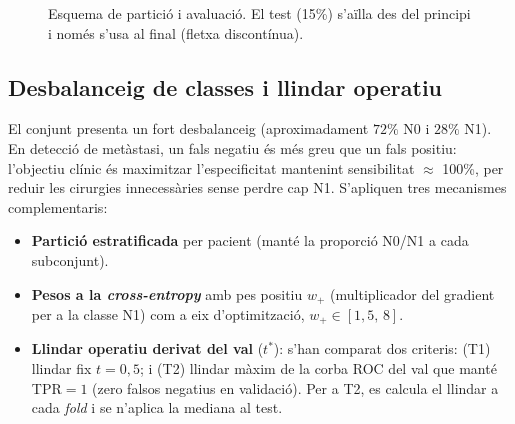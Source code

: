 \documentclass[10pt,a4paper,twocolumn,twoside]{article}
\begin{document}
\begin{figure}[h]
\centering
{}%
\caption{Esquema de partició i avaluació. El test (15\%) s'aïlla des del principi i només s'usa
al final (fletxa discontínua).}
\label{fig:split-scheme}
\end{figure}

\subsection{Desbalanceig de classes i llindar operatiu}

El conjunt presenta un fort desbalanceig (aproximadament $72\%$ N0 i $28\%$ N1). En detecció de metàstasi, un
fals negatiu és més greu que un fals positiu: l'objectiu clínic és maximitzar
l'especificitat mantenint sensibilitat $\approx$ 100\%, per reduir les cirurgies innecessàries
sense perdre cap N1. S'apliquen tres mecanismes complementaris:
\begin{itemize}\itemsep1pt
  \item \textbf{Partició estratificada} per pacient (manté la proporció N0/N1 a cada subconjunt).
  \item \textbf{Pesos a la \textit{cross-entropy}} amb pes positiu $w_+$ (multiplicador del
        gradient per a la classe N1) com a eix d'optimització, $w_+ \in [1{,}5,\,8]$.
  \item \textbf{Llindar operatiu derivat del val} ($t^*$): s'han comparat dos criteris:
        (T1) llindar fix $t\!=\!0{,}5$; i (T2) llindar màxim de la corba ROC del val que
        manté TPR$\!=\!1$ (zero falsos negatius en validació). Per a T2, es calcula el
        llindar a cada \textit{fold} i se n'aplica la mediana al test.
\end{itemize}
\end{document}
